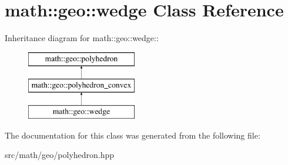 \hypertarget{classmath_1_1geo_1_1wedge}{
\section{math::geo::wedge Class Reference}
\label{classmath_1_1geo_1_1wedge}
}
Inheritance diagram for math::geo::wedge::\begin{figure}[H]
\begin{center}
\leavevmode
\includegraphics[height=3cm]{classmath_1_1geo_1_1wedge}
\end{center}
\end{figure}


The documentation for this class was generated from the following file:\begin{DoxyCompactItemize}
\item 
src/math/geo/polyhedron.hpp\end{DoxyCompactItemize}
